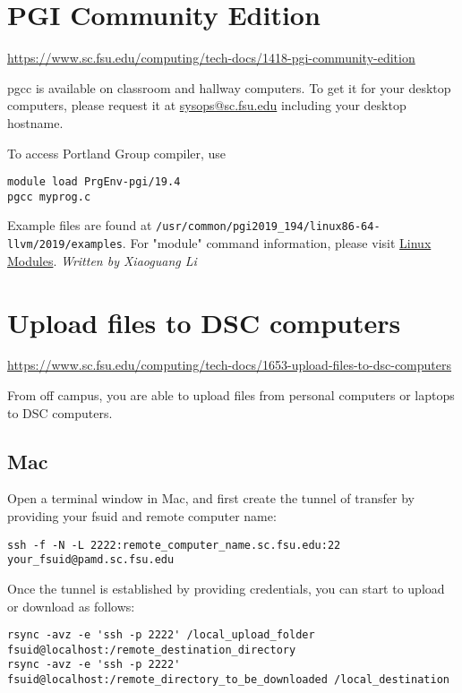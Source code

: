 \documentclass[12pt,a4paper]{article}
\begin{document}
\section{PGI Community Edition}
\url{https://www.sc.fsu.edu/computing/tech-docs/1418-pgi-community-edition}

pgcc is available on classroom and hallway computers. To get it for your desktop computers, please request it at \href{mailto:sysops@sc.fsu.edu}{sysops@sc.fsu.edu} including your desktop hostname.

To access Portland Group compiler, use
\begin{verbatim}
module load PrgEnv-pgi/19.4
pgcc myprog.c
\end{verbatim}
Example files are found at \texttt{/usr/common/pgi2019\_194/linux86-64-llvm/2019/examples}. For "module" command information, please visit \href{https://www.sc.fsu.edu/computing/tech-docs/1177-linux-modules}{Linux Modules}.
\hfill \textit{Written by Xiaoguang Li}

\section{Upload files to DSC computers}
\url{https://www.sc.fsu.edu/computing/tech-docs/1653-upload-files-to-dsc-computers}

From off campus, you are able to upload files from personal computers or laptops to DSC computers.

\subsection*{Mac}
Open a terminal window in Mac, and first create the tunnel of transfer by providing your fsuid and remote computer name:
\begin{verbatim}
ssh -f -N -L 2222:remote_computer_name.sc.fsu.edu:22 your_fsuid@pamd.sc.fsu.edu
\end{verbatim}
Once the tunnel is established by providing credentials, you can start to upload or download as follows:
\begin{verbatim}
rsync -avz -e 'ssh -p 2222' /local_upload_folder fsuid@localhost:/remote_destination_directory
rsync -avz -e 'ssh -p 2222' fsuid@localhost:/remote_directory_to_be_downloaded /local_destination
\end{verbatim}
\end{document}
